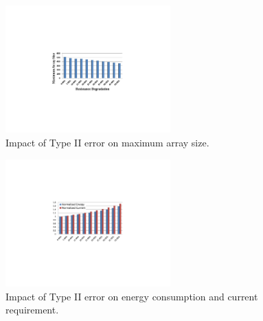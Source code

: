 
\begin{figure}[!t]
\centering
    \includegraphics[width=2.5in]{./fig/size.pdf}
\caption{Impact of Type II error on maximum array size.}
\label{fig:size}
\end{figure}

\begin{figure}[!t]
\centering
    \includegraphics[width=2.5in]{./fig/EC.pdf}
\caption{Impact of Type II error on energy consumption and current requirement.}
\label{fig:EC}
\end{figure}
